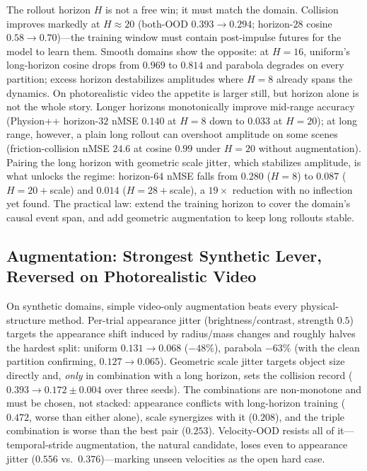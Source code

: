 The rollout horizon $H$ is not a free win; it must match the domain. Collision improves markedly at $H{\approx}20$ (both-OOD $0.393\!\to\!0.294$; horizon-$28$ cosine $0.58\!\to\!0.70$)---the training window must contain post-impulse futures for the model to learn them. Smooth domains show the opposite: at $H{=}16$, uniform's long-horizon cosine drops from $0.969$ to $0.814$ and parabola degrades on every partition; excess horizon destabilizes amplitudes where $H{=}8$ already spans the dynamics. On photorealistic video the appetite is larger still, but horizon alone is not the whole story. Longer horizons monotonically improve mid-range accuracy (Physion++ horizon-$32$ nMSE $0.140$ at $H{=}8$ down to $0.033$ at $H{=}20$); at long range, however, a plain long rollout can overshoot amplitude on some scenes (friction-collision nMSE $24.6$ at cosine $0.99$ under $H{=}20$ without augmentation). Pairing the long horizon with geometric scale jitter, which stabilizes amplitude, is what unlocks the regime: horizon-$64$ nMSE falls from $0.280$ ($H{=}8$) to $0.087$ ($H{=}20{+}$scale) and $0.014$ ($H{=}28{+}$scale), a $19\times$ reduction with no inflection yet found. The practical law: extend the training horizon to cover the domain's causal event span, and add geometric augmentation to keep long rollouts stable.

\subsection{Augmentation: Strongest Synthetic Lever, Reversed on Photorealistic Video}
\label{sec:aug}

On synthetic domains, simple video-only augmentation beats every physical-structure method. Per-trial appearance jitter (brightness/contrast, strength $0.5$) targets the appearance shift induced by radius/mass changes and roughly halves the hardest split: uniform $0.131\!\to\!0.068$ ($-48\%$), parabola $-63\%$ (with the clean \rmood{} partition confirming, $0.127\!\to\!0.065$). Geometric scale jitter targets object size directly and, \emph{only} in combination with a long horizon, sets the collision record ($0.393\!\to\!0.172\pm0.004$ over three seeds). The combinations are non-monotone and must be chosen, not stacked: appearance conflicts with long-horizon training ($0.472$, worse than either alone), scale synergizes with it ($0.208$), and the triple combination is worse than the best pair ($0.253$). Velocity-OOD resists all of it---temporal-stride augmentation, the natural candidate, loses even to appearance jitter ($0.556$ vs.\ $0.376$)---marking unseen velocities as the open hard case.


